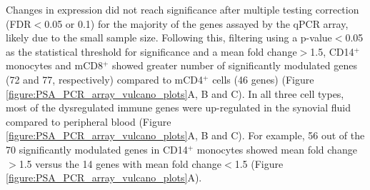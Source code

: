 Changes in expression did not reach significance after multiple testing correction (FDR$<$0.05 or 0.1) for the majority of the genes assayed by the qPCR array, likely due to the small sample size. Following this, filtering using a p-value$<$0.05 as the statistical threshold for significance and a mean fold change$>$1.5, CD14$^+$ monocytes and mCD8$^+$ showed greater number of significantly modulated genes (72 and 77, respectively) compared to mCD4$^+$ cells (46 genes) (Figure \ref{figure:PSA_PCR_array_vulcano_plots}A, B and C). In all three cell types, most of the dysregulated immune genes were up-regulated in the synovial fluid compared to peripheral blood (Figure \ref{figure:PSA_PCR_array_vulcano_plots}A, B and C). For example, 56 out of the 70 significantly modulated genes in CD14$^+$ monocytes showed mean fold change$>$1.5 versus the 14 genes with mean fold change$<$1.5 (Figure \ref{figure:PSA_PCR_array_vulcano_plots}A).

